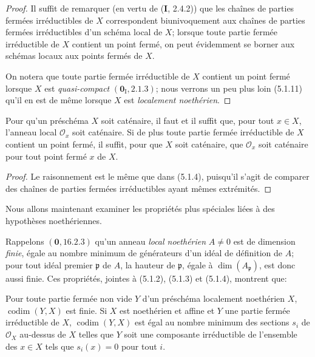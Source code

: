 \begin{proof}
Il suffit de remarquer (en vertu de (\textbf{I}, 2.4.2)) que les chaînes de parties
fermées irréductibles de $X$ correspondent biunivoquement aux chaînes de
parties fermées irréductibles d'un schéma local de $X$; lorsque toute partie
fermée irréductible de $X$ contient un point fermé, on peut évidemment se
borner aux schémas locaux aux points fermés de $X$.

On notera que toute partie fermée irréductible de $X$ contient un point fermé
lorsque $X$ est \emph{quasi-compact} $(\mathbf{0}_{\mathrm I},2.1.3)$; nous verrons un
peu plus loin (5.1.11) qu'il en est de même lorsque $X$ est \emph{localement
noethérien}.
\end{proof}

\begin{corollary}[5.1.5]
\label{IV.2.5.1.5-fr}
Pour qu'un préschéma $X$ soit caténaire, il faut et il suffit que, pour tout
$x\in X$, l'anneau local $\mathcal O_x$ soit caténaire. Si de plus toute
partie fermée irréductible de $X$ contient un point fermé, il suffit, pour que
$X$ soit caténaire, que $\mathcal O_x$ soit caténaire pour tout point fermé
$x$ de $X$.
\end{corollary}

\begin{proof}
Le raisonnement est le même que dans (5.1.4), puisqu'il s'agit de comparer des
chaînes de parties fermées irréductibles ayant mêmes extrémités.
\end{proof}

\begin{env}[5.1.6]
\label{IV.2.5.1.6-fr}
Nous allons maintenant examiner les propriétés plus spéciales liées à des
hypothèses noethériennes.

Rappelons $(\mathbf{0},16.2.3)$ qu'un anneau \emph{local noethérien} $A\ne0$ est de
dimension \emph{finie}, égale au nombre minimum de générateurs d'un idéal de
définition de $A$; pour tout idéal premier $\mathfrak p$ de $A$, la hauteur de
$\mathfrak p$, égale à $\dim(A_{\mathfrak p})$, est donc aussi finie. Ces
propriétés, jointes à (5.1.2), (5.1.3) et (5.1.4), montrent que:
\end{env}

\begin{proposition}[5.1.7]
\label{IV.2.5.1.7-fr}
Pour toute partie fermée non vide $Y$ d'un préschéma localement noethérien
$X$, $\operatorname{codim}(Y,X)$ est finie. Si $X$ est noethérien et affine
et $Y$ une partie fermée irréductible de $X$, $\operatorname{codim}(Y,X)$ est
égal au nombre minimum des sections $s_i$ de $\mathcal O_X$ au-dessus de $X$
telles que $Y$ soit une composante irréductible de l'ensemble des $x\in X$
tels que $s_i(x)=0$ pour tout $i$.
\end{proposition}

